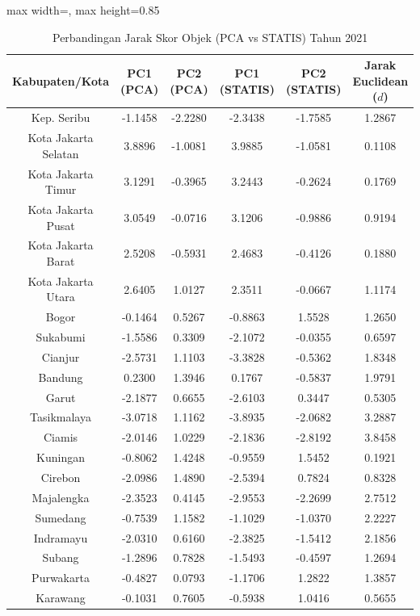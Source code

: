 \begin{table}[H]
\centering
\caption{Perbandingan Jarak Skor Objek (PCA vs STATIS) Tahun 2021} \label{tab:app1jarak_skor_2021}
\begin{adjustbox}{max width=\textwidth, max height=0.85\textheight}
\begin{tabular}{|c|c|c|c|c|c|}
\hline
\textbf{Kabupaten/Kota} & \textbf{PC1 (PCA)} & \textbf{PC2 (PCA)} & \textbf{PC1 (STATIS)} & \textbf{PC2 (STATIS)} & \textbf{Jarak Euclidean ($d$)} \\
\hline
Kep. Seribu & -1.1458 & -2.2280 & -2.3438 & -1.7585 & 1.2867 \\
Kota Jakarta Selatan & 3.8896 & -1.0081 & 3.9885 & -1.0581 & 0.1108 \\
Kota Jakarta Timur & 3.1291 & -0.3965 & 3.2443 & -0.2624 & 0.1769 \\
Kota Jakarta Pusat & 3.0549 & -0.0716 & 3.1206 & -0.9886 & 0.9194 \\
Kota Jakarta Barat & 2.5208 & -0.5931 & 2.4683 & -0.4126 & 0.1880 \\
Kota Jakarta Utara & 2.6405 & 1.0127 & 2.3511 & -0.0667 & 1.1174 \\
Bogor & -0.1464 & 0.5267 & -0.8863 & 1.5528 & 1.2650 \\
Sukabumi & -1.5586 & 0.3309 & -2.1072 & -0.0355 & 0.6597 \\
Cianjur & -2.5731 & 1.1103 & -3.3828 & -0.5362 & 1.8348 \\
Bandung & 0.2300 & 1.3946 & 0.1767 & -0.5837 & 1.9791 \\
Garut & -2.1877 & 0.6655 & -2.6103 & 0.3447 & 0.5305 \\
Tasikmalaya & -3.0718 & 1.1162 & -3.8935 & -2.0682 & 3.2887 \\
Ciamis & -2.0146 & 1.0229 & -2.1836 & -2.8192 & 3.8458 \\
Kuningan & -0.8062 & 1.4248 & -0.9559 & 1.5452 & 0.1921 \\
Cirebon & -2.0986 & 1.4890 & -2.5394 & 0.7824 & 0.8328 \\
Majalengka & -2.3523 & 0.4145 & -2.9553 & -2.2699 & 2.7512 \\
Sumedang & -0.7539 & 1.1582 & -1.1029 & -1.0370 & 2.2227 \\
Indramayu & -2.0310 & 0.6160 & -2.3825 & -1.5412 & 2.1856 \\
Subang & -1.2896 & 0.7828 & -1.5493 & -0.4597 & 1.2694 \\
Purwakarta & -0.4827 & 0.0793 & -1.1706 & 1.2822 & 1.3857 \\
Karawang & -0.1031 & 0.7605 & -0.5938 & 1.0416 & 0.5655 \\

\end{tabular}
\end{adjustbox}
\end{table}
